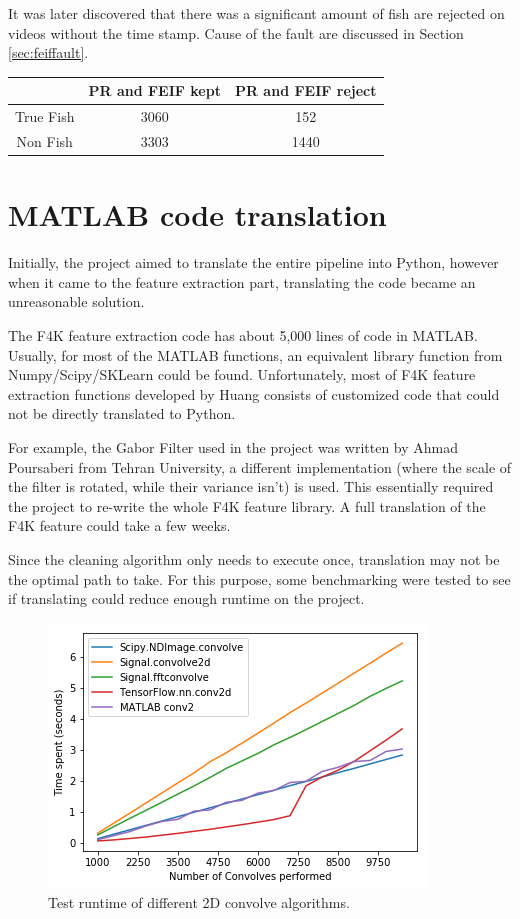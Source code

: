 \documentclass[bsc,frontabs,twoside,fullspacing,parskip,deptreport]{infthesis}
\begin{document}
It was later discovered that there was a significant amount of fish are rejected on videos without the time stamp. Cause of the fault are discussed in Section \ref{sec:feiffault}.

\begin{center}
\begin{tabular}{|c|c|c|}
\hline 
$ $ & PR and FEIF kept & PR and FEIF reject \\
\hline 
True Fish & 3060 & 152 \\
Non Fish & 3303 & 1440 \\
\hline 
\end{tabular}
\end{center}

\section{MATLAB code translation}
\label{sec:translate}

Initially, the project aimed to translate the entire pipeline into Python, however when it came to the feature extraction part, translating the code became an unreasonable solution.

The F4K feature extraction code has about 5,000 lines of code in MATLAB.
Usually, for most of the MATLAB functions, an equivalent library function from Numpy/Scipy/SKLearn could be found.
Unfortunately, most of F4K feature extraction functions developed by Huang\cite{Huang} consists of customized code that could not be directly translated to Python.

For example, the Gabor Filter used in the project was written by Ahmad Poursaberi from Tehran University, a different implementation (where the scale of the filter is rotated, while their variance isn't) is used. 
This essentially required the project to re-write the whole F4K feature library.
A full translation of the F4K feature could take a few weeks. 

Since the cleaning algorithm only needs to execute once, translation may not be the optimal path to take. 
For this purpose, some benchmarking were tested to see if translating could reduce enough runtime on the project.

\begin{figure}[h]
    \centering
    \includegraphics[scale=0.5]{graph/benchmark.png}
    \caption{Test runtime of different 2D convolve algorithms.}
    \label{fig:benchmark}
\end{figure}
\end{document}
